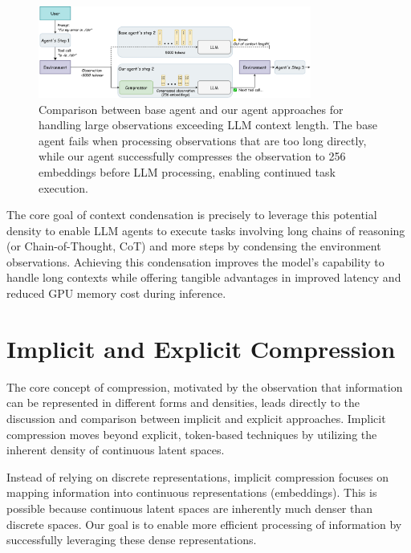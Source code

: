 \begin{figure}[hbt]
  \centering
  \includegraphics[width=0.8\textwidth]{graphs/example1.jpeg}
  \caption{Comparison between base agent and our agent approaches for handling large observations exceeding LLM context length. The base agent fails when processing observations that are too long directly, while our agent successfully compresses the observation to 256 embeddings before LLM processing, enabling continued task execution.}
  \label{fig:example1}
\end{figure}

The core goal of context condensation is precisely to leverage this potential density to enable LLM agents to execute tasks involving long chains of reasoning (or Chain-of-Thought, CoT) and more steps by condensing the environment observations.
Achieving this condensation improves the model's capability to handle long contexts while offering tangible advantages in improved latency and reduced GPU memory cost during inference.




\section{Implicit and Explicit Compression}

The core concept of compression, motivated by the observation that information can be represented in different forms and densities, leads directly to the discussion and comparison between implicit and explicit approaches.
Implicit compression moves beyond explicit, token-based techniques by utilizing the inherent density of continuous latent spaces.

Instead of relying on discrete representations, implicit compression focuses on mapping information into continuous representations (embeddings).
This is possible because continuous latent spaces are inherently much denser than discrete spaces.
Our goal is to enable more efficient processing of information by successfully leveraging these dense representations.